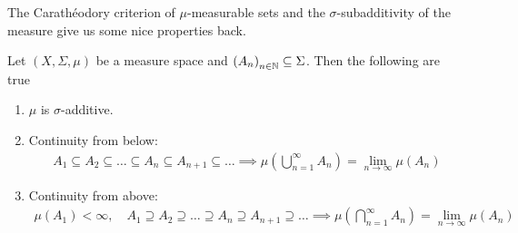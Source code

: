 The Carathéodory criterion of $\mu$-measurable sets and the $\sigma$-subadditivity of the measure give us some nice properties back.

\begin{thm}[]
  Let $(X, \Sigma, \mu)$ be a measure space and $\left(A_{n}\right)_{n \in \mathbb{N}} \subseteq \Sigma$. Then the following are true
  \begin{enumerate}
    \item $\mu$ is $\sigma$-additive.
    \item Continuity from below: 
      \begin{align*}
        A_1 \subseteq A_2 \subseteq \ldots \subseteq A_n \subseteq A_{n+1} \subseteq \ldots \implies 
        \mu \left(\bigcup_{n=1}^{\infty}A_n \right) 
        = \lim_{n \to \infty}\mu(A_n)
      \end{align*}
    \item Continuity from above:
      \begin{align*}
        \mu(A_1) < \infty, \quad
        A_1 \supseteq A_2 \supseteq \ldots \supseteq A_n \supseteq A_{n+1} \supseteq \ldots
        \implies
        \mu\left(
          \bigcap_{n=1}^{\infty}A_n
        \right)
        =
        \lim_{n \to \infty} \mu(A_n)
      \end{align*}

  \end{enumerate}
\end{thm}
